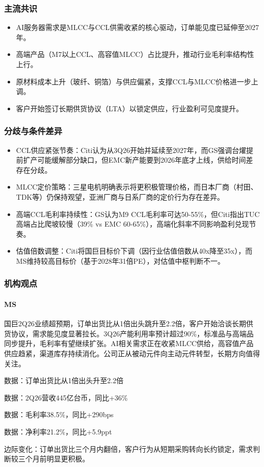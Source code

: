 \documentclass[11pt]{ctexart}
\begin{document}
\subsubsection*{主流共识}
\begin{itemize}
  \item AI服务器需求是MLCC与CCL供需收紧的核心驱动，订单能见度已延伸至2027年。
  \item 高端产品（M7以上CCL、高容值MLCC）占比提升，推动行业毛利率结构性上行。
  \item 原材料成本上升（玻纤、铜箔）与供应偏紧，支撑CCL与MLCC价格进一步上调。
  \item 客户开始签订长期供货协议（LTA）以锁定供应，行业盈利可见度提升。
\end{itemize}
\subsubsection*{分歧与条件差异}
\begin{itemize}
  \item CCL供应紧张节奏：Citi认为从3Q26开始并延续至2027年，而GS强调台燿提前扩产可能缓解部分缺口，但EMC新产能要到2026年底才上线，供给时间差存在分歧。
  \item MLCC定价策略：三星电机明确表示将更积极管理价格，而日本厂商（村田、TDK等）仍保持观望，亚洲厂商与日系厂商的定价行为存在差异。
  \item 高端CCL毛利率持续性：GS认为M9 CCL毛利率可达50-55\%，但Citi指出TUC高端占比爬坡较慢（39\% vs EMC 60-65\%），高端化斜率不同影响盈利兑现节奏。
  \item 估值倍数调整：Citi将国巨目标价下调（因行业估值倍数从40x降至35x），而MS维持较高目标价（基于2028年31倍PE），对估值中枢判断不一。
\end{itemize}
\subsubsection*{机构观点}
\paragraph{MS} 国巨2Q26业绩超预期，订单出货比从1倍出头跳升至2.2倍，客户开始洽谈长期供货协议，需求能见度显著拉长。3Q26产能利用率预计超过90\%，标准品与高端品同步提升，毛利率有望继续扩张。AI相关需求正在收紧MLCC供给，高容值产品供应趋紧，渠道库存持续消化。公司正从被动元件向主动元件转型，长期方向值得关注。
{\small\color{refgray}数据：订单出货比从1倍出头升至2.2倍\par}
{\small\color{refgray}数据：2Q26营收445亿台币，同比+36\%\par}
{\small\color{refgray}数据：毛利率38.5\%，同比+290bps\par}
{\small\color{refgray}数据：净利率21.2\%，同比+5.9ppt\par}
{\small\color{refgray}边际变化：订单出货比三个月内翻倍，客户行为从短期采购转向长约锁定，需求判断较三个月前明显更积极。\par}
\end{document}
